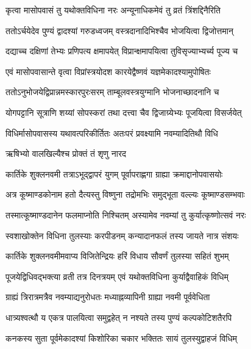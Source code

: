 \twolineshloka
{कृत्वा मासोपवासं तु यथोक्तविधिना नरः}
{अन्यूनाधिकमेवं तु व्रतं त्रिंशद्दिनैरिति} %

\twolineshloka
{ततोऽर्चयेदेव पुण्यं द्वादश्यां गरुडध्वजम्}
{वस्त्रदानादिभिश्चैव भोजयित्वा द्विजोत्तमान्} %

\twolineshloka
{दद्याच्च दक्षिणां तेभ्यः प्रणिपत्य क्षमापयेत्}
{विप्रान्क्षमापयित्वा तुविसृज्याभ्यर्च्य पूज्य च} %

\twolineshloka
{एवं मासोपवासान्ते वृत्वा विप्रांस्त्रयोदश}
{कारयेद्वैष्णवं यज्ञमेकादश्यामुपोषितः} %

\twolineshloka
{ततोऽनुभोजयेद्विप्रान्नमस्कारपुरःसरम्}
{ताम्बूलवस्त्रयुग्मानि भोजनाच्छादनानि च} %

\twolineshloka
{योगपट्टानि सूत्राणि शय्यां सोपस्करां तथा}
{दत्त्वा चैव द्विजाग्र्येभ्यः पूजयित्वा विसर्जयेत्} %

\twolineshloka
{विधिर्मासोपवासस्य यथावत्परिकीर्तितः}
{अतःपरं प्रवक्ष्यामि नवम्यादितिथौ विधि} %


\onelineshloka
{ऋषिभ्यो वालखिल्यैश्च प्रोक्तं तं शृणु नारद} %





\twolineshloka
{कार्तिके शुक्लनवमी तत्राऽभूद्द्वापरं युगम्}
{पूर्वापराह्णगा ग्राह्या क्रमाद्दानोपवासयोः} %

\twolineshloka
{अत्र कूष्माण्डकोनाम हतो दैत्यस्तु विष्णुना}
{तद्रोमभिः समुद्भूता वल्ल्यः कूष्माण्डसम्भवाः} %

\twolineshloka
{तस्मात्कूष्माण्डदानेन फलमाप्नोति निश्चितम्}
{अस्यामेव नवम्यां तु कुर्यात्कृष्णोत्सवं नरः} %

\twolineshloka
{स्वशाखोक्तेन विधिना तुलस्याः करपीडनम्}
{कन्यादानफलं तस्य जायते नात्र संशयः} %

\twolineshloka
{कार्तिके शुक्लनवमीमवाप्य विजितेन्द्रियः}
{हरिं विधाय सौवर्णं तुलस्या सहितं शुभम्} %

\twolineshloka
{पूजयेद्विधिवद्भक्त्या व्रती तत्र दिनत्रयम्}
{एवं यथोक्तविधिना कुर्याद्वैवाहिकं विधिम्} %

\twolineshloka
{ग्राह्यं त्रिरात्रमत्रैव नवम्याद्यनुरोधतः}
{मध्याह्नव्यापिनी ग्राह्या नवमी पूर्ववेधिता} %

\twolineshloka
{धात्र्यश्वत्थौ य एकत्र पालयित्वा समुद्वहेत्}
{न नश्यते तस्य पुण्यं कल्पकोटिशतैरपि} %

\twolineshloka
{कनकस्य सुता पूर्वमेकादश्यां किशोरिका}
{चकार भक्तितः सायं तुलस्युद्वाहजं विधिम्} %

